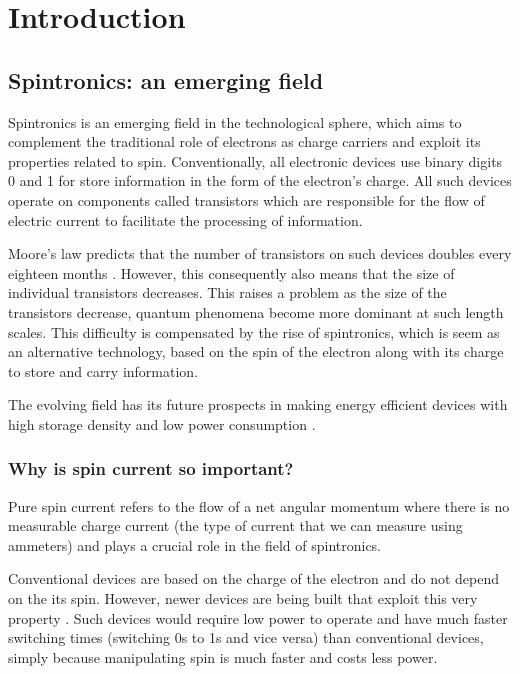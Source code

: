 \chapter{Introduction}

\label{chapter1}

\section{Spintronics: an emerging field}

Spintronics is an emerging field in the technological sphere, which aims to complement the traditional role of electrons as charge carriers and exploit its properties related to spin.
Conventionally, all electronic devices use binary digits 0 and 1 for store information in the form of the electron's charge.
All such devices operate on components called transistors which are responsible for the flow of electric current to facilitate the processing of information.

Moore's law predicts that the number of transistors on such devices doubles every eighteen months \cite{moore1998cramming}.
However, this consequently also means that the size of individual transistors decreases.
This raises a problem as the size of the transistors decrease, quantum phenomena become more dominant at such length scales.
This difficulty is compensated by the rise of spintronics, which is seem as an alternative technology, based on the spin of the electron along with its charge to store and carry information.

The evolving field has its future prospects in making energy efficient devices with high storage density and low power consumption \cite{Yakout_2020}.

\subsection{Why is spin current so important?}

Pure spin current refers to the flow of a net angular momentum where there is no measurable charge current (the type of current that we can measure using ammeters) and plays a crucial role in the field of spintronics.

Conventional devices are based on the charge of the electron and do not depend on the its spin.
However, newer devices are being built that exploit this very property \cite{wolf2001spintronics,vzutic2004spintronics}.
Such devices would require low power to operate and have much faster switching times (switching 0s to 1s and vice versa) than conventional devices, simply because manipulating spin is much faster and costs less power.


